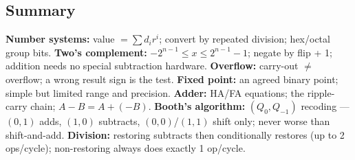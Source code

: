 \documentclass[11pt]{article}
\begin{document}
\subsection{Summary}

\textbf{Number systems:} value $= \sum d_i r^i$; convert by repeated division; hex/octal group bits. \textbf{Two's complement:} $-2^{n-1} \le x \le 2^{n-1}-1$; negate by flip + 1; addition needs no special subtraction hardware. \textbf{Overflow:} carry-out $\neq$ overflow; a wrong result sign is the test. \textbf{Fixed point:} an agreed binary point; simple but limited range and precision. \textbf{Adder:} HA/FA equations; the ripple-carry chain; $A-B = A+(-B)$. \textbf{Booth's algorithm:} $(Q_0,Q_{-1})$ recoding --- $(0,1)$ adds, $(1,0)$ subtracts, $(0,0)$/$(1,1)$ shift only; never worse than shift-and-add. \textbf{Division:} restoring subtracts then conditionally restores (up to 2 ops/cycle); non-restoring always does exactly 1 op/cycle.



\end{document}
